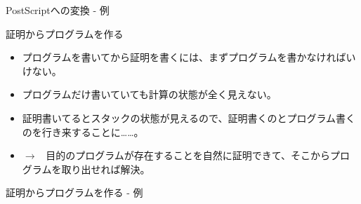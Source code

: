\documentclass[cjk, 14pt]{beamer}
\begin{document}
\begin{frame}{PostScriptへの変換 - 例}

\end{frame}

\begin{frame}{証明からプログラムを作る}

  \begin{itemize}
    \item プログラムを書いてから証明を書くには、まずプログラムを書かなければいけない。
    \item プログラムだけ書いていても計算の状態が全く見えない。
    \item 証明書いてるとスタックの状態が見えるので、証明書くのとプログラム書くのを行き来することに……。
    \item $\rightarrow$ \, 目的のプログラムが存在することを自然に証明できて、そこからプログラムを取り出せれば解決。
  \end{itemize}

\end{frame}

\begin{frame}{証明からプログラムを作る - 例}

\end{frame}
\end{document}
